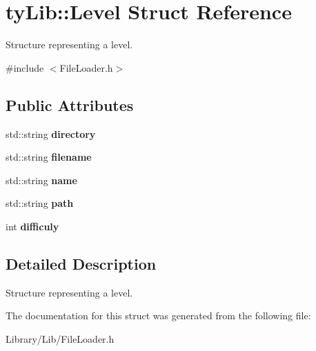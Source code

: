 \hypertarget{structty_lib_1_1_level}{}\section{ty\+Lib\+:\+:Level Struct Reference}
\label{structty_lib_1_1_level}


Structure representing a level.  




{\ttfamily \#include $<$File\+Loader.\+h$>$}

\subsection*{Public Attributes}
\begin{DoxyCompactItemize}
\item 
\hypertarget{structty_lib_1_1_level_a0834244c98144569fa9dcb69376f63c3}{}std\+::string {\bfseries directory}\label{structty_lib_1_1_level_a0834244c98144569fa9dcb69376f63c3}

\item 
\hypertarget{structty_lib_1_1_level_a1685788a754f7a82cceadb738fbf1d3a}{}std\+::string {\bfseries filename}\label{structty_lib_1_1_level_a1685788a754f7a82cceadb738fbf1d3a}

\item 
\hypertarget{structty_lib_1_1_level_aa1a32ca53e40f873ae91265b8d729108}{}std\+::string {\bfseries name}\label{structty_lib_1_1_level_aa1a32ca53e40f873ae91265b8d729108}

\item 
\hypertarget{structty_lib_1_1_level_ae8299cd276a7b9f87d2542948e39c3f9}{}std\+::string {\bfseries path}\label{structty_lib_1_1_level_ae8299cd276a7b9f87d2542948e39c3f9}

\item 
\hypertarget{structty_lib_1_1_level_a292f25127134c9c27c7c16c51dd2a385}{}int {\bfseries difficuly}\label{structty_lib_1_1_level_a292f25127134c9c27c7c16c51dd2a385}

\end{DoxyCompactItemize}


\subsection{Detailed Description}
Structure representing a level. 

The documentation for this struct was generated from the following file\+:\begin{DoxyCompactItemize}
\item 
Library/\+Lib/File\+Loader.\+h\end{DoxyCompactItemize}

